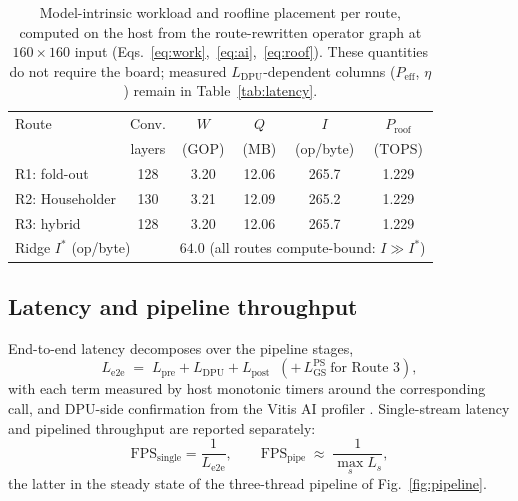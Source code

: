\documentclass[onecolumn,journal]{IEEEtran}
\begin{document}
\begin{table}[t]
\centering
\caption{Model-intrinsic workload and roofline placement per route, computed on the
host from the route-rewritten operator graph at $160{\times}160$ input
(Eqs.~\eqref{eq:work},~\eqref{eq:ai},~\eqref{eq:roof}). These quantities do not require
the board; measured $L_{\mathrm{DPU}}$-dependent columns ($P_{\mathrm{eff}}$, $\eta$)
remain in Table~\ref{tab:latency}.}
\label{tab:workload}
\setlength{\tabcolsep}{4pt}
\renewcommand{\arraystretch}{1.25}
\begin{tabular}{lccccc}
\toprule
Route & Conv. & $W$ & $Q$ & $I$ & $P_{\mathrm{roof}}$\\
      & layers & (GOP) & (MB) & (op/byte) & (TOPS)\\
\midrule
R1: fold-out    & 128 & 3.20 & 12.06 & 265.7 & 1.229\\
R2: Householder & 130 & 3.21 & 12.09 & 265.2 & 1.229\\
R3: hybrid      & 128 & 3.20 & 12.06 & 265.7 & 1.229\\
\midrule
\multicolumn{2}{l}{Ridge $I^{\ast}$ (op/byte)} & \multicolumn{4}{c}{$64.0$ (all routes compute-bound: $I \gg I^{\ast}$)}\\
\bottomrule
\end{tabular}
\end{table}

\subsection{Latency and pipeline throughput}
End-to-end latency decomposes over the pipeline stages,
\begin{equation}
L_{\mathrm{e2e}} \;=\; L_{\mathrm{pre}} + L_{\mathrm{DPU}} + L_{\mathrm{post}}
\;\;(+\,L_{\mathrm{GS}}^{\mathrm{PS}}\ \text{for Route 3}),
\label{eq:lat}
\end{equation}
with each term measured by host monotonic timers around the corresponding call, and
DPU-side confirmation from the Vitis AI profiler \cite{amd_ug1414}. Single-stream
latency and pipelined throughput are reported separately:
\begin{equation}
\mathrm{FPS}_{\mathrm{single}} = \frac{1}{L_{\mathrm{e2e}}},
\qquad
\mathrm{FPS}_{\mathrm{pipe}} \;\approx\; \frac{1}{\max_s L_s},
\label{eq:fpspipe}
\end{equation}
the latter in the steady state of the three-thread pipeline of
Fig.~\ref{fig:pipeline}.
\end{document}
